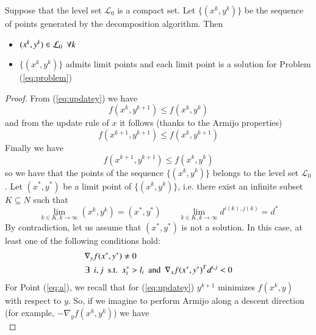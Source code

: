 \begin{proposition}
Suppose that the level set $\mathcal{L}_0$ is a compact set. Let $\{(x^k, y^k)\}$ be the sequence of points generated by the decomposition algorithm. Then
\begin{itemize}
\item $(x^k, y^k) \in \mathcal{L}_0 \enskip \forall k$ 
\item  $\{(x^k, y^k)\}$ admits limit points and each limit point is a solution for Problem (\ref{eq:problem})
\end{itemize}
\end{proposition}
\begin{proof}
From (\ref{eq:updatey}) we have
\begin{equation}
f(x^{k}, y^{k+1}) \leq f(x^{k}, y^{k})
\end{equation}
and from the update rule of $x$ it follows (thanks to the Armijo properties)
\begin{equation}\label{eq:dec}
f(x^{k+1}, y^{k+1}) \leq f(x^{k}, y^{k+1})
\end{equation}
Finally we have
\begin{equation}
f(x^{k+1}, y^{k+1}) \leq f(x^{k}, y^{k})
\end{equation}
so we have that the points of the sequence $\{(x^{k}, y^{k})\}$ belongs to the level set $\mathcal{L}_0$. Let $(x^*,y^*)$ be a limit point of $\{(x^k, y^k)\}$, i.e. there exist an infinite subset $K \subseteq N$ such that
\begin{equation}\label{eq:asim}
\lim_{k \in K, k \rightarrow \infty} (x^k, y^k) = (x^*,y^*) \qquad \lim_{k \in K, k \rightarrow \infty} d^{i(k),j(k)} = d^*
\end{equation}
By contradiction, let us assume that $(x^*,y^*)$ is not a solution. In this case, at least one of the following conditions hold:
\begin{subequations}
\begin{align}
&\nabla_y f(x^*,y^*) \neq 0  \label{eq:a}\\
&\exists \enskip i, j \enskip  \text{s.t.} \enskip x^*_i > l_i \enskip  \text{and} \enskip  \nabla_x f(x^*,y^*)^T d^{i,j} < 0 \label{eq:b}
\end{align}
\end{subequations}
For Point (\ref{eq:a}), we recall that for (\ref{eq:updatey}) $y^{k+1}$ minimizes $f(x^{k},y)$ with respect to $y$. So, if we imagine to perform Armijo along a descent direction (for example, $-\nabla_y f(x^{k},y^{k})$) we have
\begin{equation}\label{eq:dis}

\end{equation}
\end{proof}
